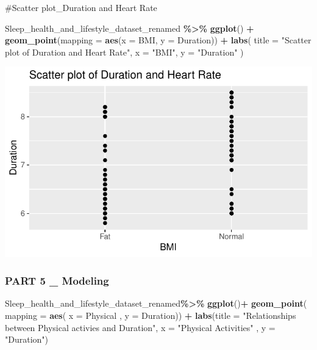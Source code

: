 \documentclass[
  11pt,
]{article}
\newenvironment{Shaded}{\begin{snugshade}}{\end{snugshade}}
\newcommand{\AttributeTok}[1]{\textcolor[rgb]{0.13,0.29,0.53}{#1}}
\newcommand{\FunctionTok}[1]{\textcolor[rgb]{0.13,0.29,0.53}{\textbf{#1}}}
\newcommand{\NormalTok}[1]{#1}
\newcommand{\SpecialCharTok}[1]{\textcolor[rgb]{0.81,0.36,0.00}{\textbf{#1}}}
\newcommand{\StringTok}[1]{\textcolor[rgb]{0.31,0.60,0.02}{#1}}
\begin{document}
\#Scatter plot\_Duration and Heart Rate

\begin{Shaded}
\begin{Highlighting}[]
\NormalTok{Sleep\_health\_and\_lifestyle\_dataset\_renamed    }\SpecialCharTok{\%\textgreater{}\%} 
\FunctionTok{ggplot}\NormalTok{()    }\SpecialCharTok{+}
\FunctionTok{geom\_point}\NormalTok{(}\AttributeTok{mapping =} \FunctionTok{aes}\NormalTok{(}\AttributeTok{x =}\NormalTok{ BMI, }\AttributeTok{y =}\NormalTok{ Duration))    }\SpecialCharTok{+} 
\FunctionTok{labs}\NormalTok{(}
\AttributeTok{title =} \StringTok{"Scatter plot of Duration and Heart Rate"}\NormalTok{, }
\AttributeTok{x =} \StringTok{"BMI"}\NormalTok{,}
\AttributeTok{y =} \StringTok{"Duration"} 
\NormalTok{)}
\end{Highlighting}
\end{Shaded}

\begin{center}\includegraphics[width=0.7\linewidth]{SleepHelath_files/figure-latex/unnamed-chunk-23-1} \end{center}

\hypertarget{part-5-_-modeling}{%
\subsubsection{PART 5 \_ Modeling}\label{part-5-_-modeling}}

\begin{Shaded}
\begin{Highlighting}[]
\NormalTok{Sleep\_health\_and\_lifestyle\_dataset\_renamed}\SpecialCharTok{\%\textgreater{}\%}
  \FunctionTok{ggplot}\NormalTok{()}\SpecialCharTok{+}
  \FunctionTok{geom\_point}\NormalTok{( }\AttributeTok{mapping =} \FunctionTok{aes}\NormalTok{( }\AttributeTok{x  =}\NormalTok{ Physical , }\AttributeTok{y =}\NormalTok{ Duration)) }\SpecialCharTok{+}
  \FunctionTok{labs}\NormalTok{(}\AttributeTok{title =} \StringTok{"Relationships between Physical activies and Duration"}\NormalTok{,}
       \AttributeTok{x =} \StringTok{"Physical Activities"}\NormalTok{ , }\AttributeTok{y =} \StringTok{"Duration"}\NormalTok{)}
\end{Highlighting}
\end{Shaded}
\end{document}
